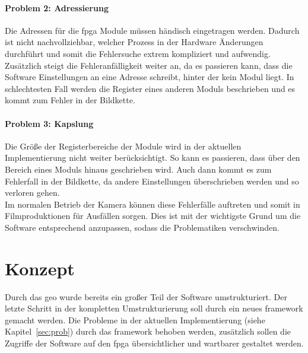 \paragraph*{Problem 2: Adressierung} Die Adressen für die \ac{fpga} Module müssen händisch eingetragen werden. Dadurch ist nicht nachvollziehbar, welcher Prozess in der Hardware Änderungen durchführt und somit die Fehlersuche extrem kompliziert und aufwendig. Zusätzlich steigt die Fehleranfälligkeit weiter an, da es passieren kann, dass die Software Einstellungen an eine Adresse schreibt, hinter der kein Modul liegt. In schlechtesten Fall werden die Register eines anderen Moduls beschrieben und es kommt zum Fehler in der Bildkette. 

\paragraph*{Problem 3: Kapslung} Die Größe der Registerbereiche der Module wird in der aktuellen Implementierung nicht weiter berücksichtigt. So kann es passieren, dass über den Bereich eines Moduls hinaus geschrieben wird. Auch dann kommt es zum Fehlerfall in der Bildkette, da andere Einstellungen überschrieben werden und so verloren gehen. \\



Im normalen Betrieb der Kamera können diese Fehlerfälle auftreten und somit in Filmproduktionen für Ausfällen sorgen. Dies ist mit der wichtigste Grund um die Software entsprechend anzupassen, sodass die Problematiken verschwinden.


\section{Konzept}\label{sec:konzept}
Durch das \ac{geo} wurde bereits ein großer Teil der Software umstrukturiert. Der letzte Schritt in der kompletten Umstrukturierung soll durch ein neues \gls{framework} gemacht werden. 
Die Probleme in der aktuellen Implementierung (siehe Kapitel~\ref{sec:prob}) 
durch das \gls{framework} behoben werden, zusätzlich sollen die Zugriffe der Software auf den \ac{fpga} übersichtlicher und wartbarer gestaltet werden.

